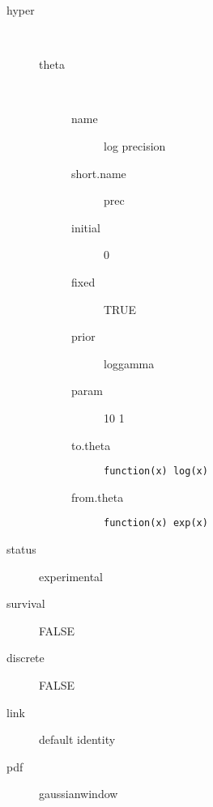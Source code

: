 \begin{description}
	\item[hyper]\ 
	 \begin{description}
	 	\item[theta]\ 
	 	 \begin{description}
	 	 	 \item[ name ] log precision 
	 	 	 \item[ short.name ] prec 
	 	 	 \item[ initial ] 0 
	 	 	 \item[ fixed ] TRUE 
	 	 	 \item[ prior ] loggamma 
	 	 	 \item[ param ] 10 1 
	 	 	 \item[ to.theta ] \verb|function(x) log(x)| 
	 	 	 \item[ from.theta ] \verb|function(x) exp(x)| 
	 	 \end{description}
	 \end{description}
	 \item[ status ] experimental 
	 \item[ survival ] FALSE 
	 \item[ discrete ] FALSE 
	 \item[ link ] default identity 
	 \item[ pdf ] gaussianwindow 
\end{description}
